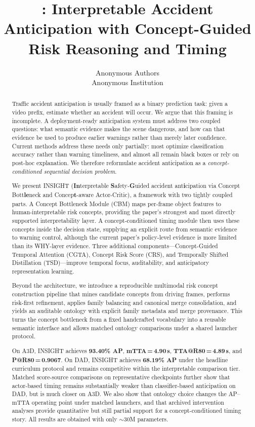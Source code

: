 \documentclass{article}
\title{\method: Interpretable Accident Anticipation with Concept-Guided Risk Reasoning and Timing}
\author{Anonymous Authors \\ Anonymous Institution}
\newcommand{\method}{\textsc{INSIGHT}}
\newcommand{\cbm}{\textsc{CBM}}
\newcommand{\cgta}{\textsc{CGTA}}
\newcommand{\crs}{\textsc{CRS}}
\newcommand{\tsd}{\textsc{TSD}}
\begin{document}
\maketitle

\begin{abstract}
Traffic accident anticipation is usually framed as a binary prediction task:
given a video prefix, estimate whether an accident will occur.
We argue that this framing is incomplete.
A deployment-ready anticipation system must address two coupled questions:
what semantic evidence makes the scene dangerous, and how can that evidence be
used to produce earlier warnings rather than merely later confidence.
Current methods address these needs only partially: most optimize
classification accuracy rather than warning timeliness, and almost all remain
black boxes or rely on post-hoc explanation.
We therefore reformulate accident anticipation as a
\emph{concept-conditioned sequential decision problem}.

We present \method{} (\textbf{In}terpretable \textbf{S}afety-\textbf{G}uided
accident ant\textbf{i}cipation via Concept Bott\textbf{le}neck and
Concep\textbf{t}-aware Actor-Critic), a framework with two tightly coupled
parts. A Concept Bottleneck Module (\cbm) maps per-frame object features to
human-interpretable risk concepts, providing the paper's strongest and most
directly supported interpretability layer. A concept-conditioned timing module
then uses these concepts inside the decision state, supplying an explicit route
from semantic evidence to warning control, although the current paper's
policy-level evidence is more limited than its WHY-layer evidence. Three
additional components---Concept-Guided Temporal Attention (\cgta), Concept Risk
Score (\crs), and Temporally Shifted Distillation (\tsd)---improve temporal
focus, auditability, and anticipatory representation learning.

Beyond the architecture, we introduce a reproducible multimodal risk concept
construction pipeline that mines candidate concepts from driving frames,
performs risk-first refinement, applies family balancing and canonical merge
consolidation, and yields an auditable ontology with explicit family metadata
and merge provenance. This turns the concept bottleneck from a fixed handcrafted
vocabulary into a reusable semantic interface and allows matched ontology
comparisons under a shared launcher protocol.

On A3D, \method{} achieves \textbf{93.40\% AP}, \textbf{mTTA\,=\,4.90\,s},
\textbf{TTA@R80\,=\,4.89\,s}, and \textbf{P@R80\,=\,0.9067}.
On DAD, \method{} achieves \textbf{68.19\% AP} under the headline curriculum
protocol and remains competitive within the interpretable comparison tier.
Matched score-source comparisons on representative checkpoints further show
that actor-based timing remains substantially weaker than classifier-based
anticipation on DAD, but is much closer on A3D. We also show that ontology
choice changes the AP--mTTA operating point under matched launchers, and that
archived intervention analyses provide quantitative but still partial support
for a concept-conditioned timing story. All results are obtained with only
$\sim$30M parameters.
\end{abstract}
\end{document}
